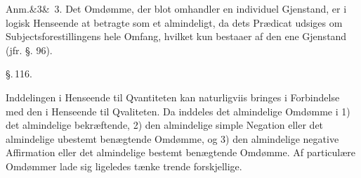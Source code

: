\documentclass[12pt]{book}
\def\sperr#1{#1}%
\def\textit#1{#1}%
\def\emph#1{#1}%
\newcommand{\sperr}[1]{\textls[180]{#1}}
\newcommand{\parag}[1]{%
  \par\vspace{0.9\baselineskip}%
  {\centering\textit{\S.\,#1.}\par}%
  \vspace{0.35\baselineskip}%
  \noindent\hspace{\parindent}\ignorespaces
}
\newcommand{\anm}[1]{%
  \par\vspace{0.5\baselineskip}%
  \noindent\hspace{\parindent}\sperr{Anm.}\ifx&#1&\else~\textit{#1}.\fi
  \enspace\ignorespaces
}
\begin{document}
\anm{3} Det Omdømme, der blot omhandler en individuel Gjenstand, er i logisk Henseende
at betragte som et almindeligt, da dets Prædicat udsiges om Subjectsforestillingens
hele Omfang, hvilket kun bestaaer af den ene Gjenstand (jfr. §. 96).

\parag{116}

Inddelingen i Henseende til \emph{Qvantiteten} kan naturligviis bringes i
\emph{Forbindelse} med den i Henseende til \emph{Qvaliteten}. Da inddeles det
\emph{almindelige Omdømme i 1) det almindelige bekræftende, 2) den almindelige simple
Negation eller det almindelige ubestemt benægtende Omdømme, og 3) den almindelige
negative Affirmation eller det almindelige bestemt benægtende Omdømme.} Af particulære
Omdømmer lade sig ligeledes tænke trende forskjellige.
\end{document}

